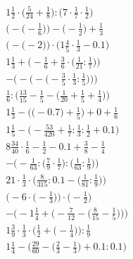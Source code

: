 \documentclass[8pt]{article}
\begin{document}
\begin{align}
1\frac{1}{2} \cdot \big(\frac{5}{24} + \frac{1}{8}\big) : \big(7 \cdot \frac{1}{7} \cdot \frac{1}{2}\big) \\
\Big(-\big(-\frac{1}{6}\big)\Big) - \Big(-\frac{1}{2}\Big) + \frac{1}{3} \\
\Big(-\big(-2\big)\Big) \cdot \Big(1\frac{4}{5} \cdot \frac{1}{3} - 0.1\Big) \\
1\frac{1}{3} + \Big(-\frac{1}{6} + \frac{3}{6} \cdot \big(\frac{1}{21} : \frac{1}{7}\big)\Big) \\
-\bigg(-\Big(-\big(-\frac{3}{5} \cdot \frac{1}{3} : \frac{1}{5}\big)\Big)\bigg) \\
\frac{1}{6} : \Big(\frac{13}{15} - \frac{1}{5} - \big(\frac{1}{20} + \frac{1}{5} + \frac{1}{4}\big)\Big) \\
1\frac{1}{3} - \Big(\big(-0.7\big) + \frac{1}{5}\Big) + 0 + \frac{1}{6} \\
1\frac{1}{5} - \big(-\frac{53}{420} + \frac{1}{7} : \frac{1}{3} : \frac{1}{2} + 0.1\big) \\
8\frac{34}{40} \cdot \frac{1}{6} - \frac{1}{2} - 0.1 + \frac{3}{8} - \frac{1}{4} \\
-\Big(-\frac{1}{63} : \big(\frac{7}{9} \cdot \frac{1}{7}\big) : \big(\frac{1}{63} : \frac{1}{9}\big)\Big) \\
21 \cdot \frac{1}{3} \cdot \Big(\frac{8}{315} : 0.1 - \big(\frac{1}{81} : \frac{1}{9}\big)\Big) \\
\Big(-6 \cdot \big(-\frac{1}{3}\big)\Big) \cdot \Big(-\frac{1}{2}\Big) \\
-\bigg(-1\frac{1}{4} + \Big(-\frac{7}{12} - \big(\frac{8}{15} - \frac{1}{5}\big)\Big)\bigg) \\
1\frac{3}{9} \cdot \frac{1}{3} \cdot \Big(\frac{1}{2} + \big(-\frac{1}{4}\big)\Big) : \frac{1}{9} \\
1\frac{1}{4} - \Big(\frac{29}{60} - \big(\frac{2}{3} - \frac{1}{3}\big) + 0.1 : 0.1\Big)
\end{align}
\end{document}
